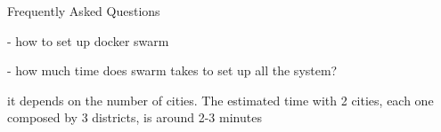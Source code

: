 Frequently Asked Questions

- how to set up docker swarm

- how much time does swarm takes to set up all the system?

it depends on the number of cities. The estimated time with 2 cities, each one
composed by 3 districts, is around 2-3 minutes